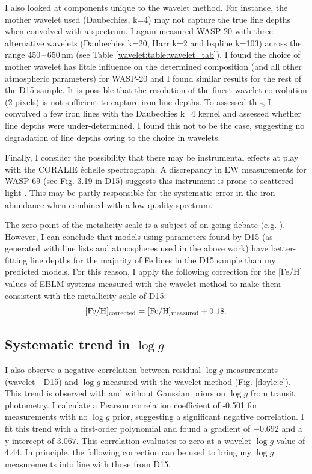 I also looked at components unique to the wavelet method. For instance, the mother wavelet used (Daubechies, k=4) may not capture the true line depths when  convolved with a spectrum. I again measured WASP-20 with three alternative wavelets (Daubechies k=20, Harr k=2 and bspline  k=103) across the range 450\,--\,650\,nm  (see Table \ref{wavelet:table:wavelet_tab}). I found the choice of mother wavelet has little influence on the determined composition (and  all other atmospheric parameters) for WASP-20 and I found similar results for the rest of the D15 sample.  It is possible that the resolution of the finest wavelet convolution (2 pixels) is not sufficient to capture iron line depths. To assessed this, I convolved a few iron lines with the Daubechies k=4 kernel and assessed  whether line depths were under-determined. I found this not to be the case, suggesting no degradation of line depths owing to the choice in wavelets. 

Finally, I consider the possibility that there may be instrumental effects at play with the CORALIE \'{e}chelle spectrograph. A discrepancy in EW measurements for WASP-69 (see Fig. 3.19 in D15) suggests this instrument is prone to scattered light \citep{Doyle2015}. This may be partly responsible for the systematic error in the iron abundance when combined with a low-quality spectrum. 

The zero-point of the metalicity scale is a subject of on-going debate (e.g. \citealt{Kraft2004}). However, I can conclude that models using parameters found by D15 (as generated with line lists and atmospheres used in the above work) have better-fitting line depths for the majority of Fe lines in the D15 sample than my predicted models. For this reason, I apply the following correction for the [Fe/H] values of EBLM systems measured with the wavelet method to make them consistent with the metallicity scale of D15:
\begin{equation}\label{composition_correction}
\rm [Fe/H]_{\rm corrected} = \rm [Fe/H]_{\rm measured} + 0.18.
\end{equation}  



\subsection{Systematic trend in $\log g$}

I also observe a negative correlation between residual $\log g$ measurements (wavelet - D15) and $\log g$ measured with the wavelet method (Fig. \ref{doyle:c}). This trend is observed with and without Gaussian priors on $\log g$ from transit photometry. I calculate a Pearson correlation coefficient of -0.501 for measurements with no $\log g$ prior, suggesting a significant negative correlation. I fit this trend with a first-order polynomial and found a gradient of $-0.692$ and a y-intercept of $3.067$. This correlation evaluates to zero at a wavelet $\log g$ value of 4.44. In principle, the following correction can be used to bring my $\log g$ measurements into line with those from D15,

